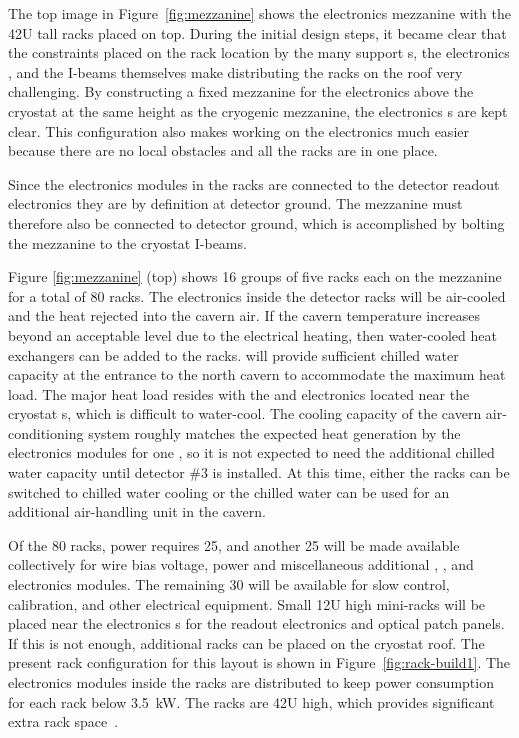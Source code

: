 The top image in Figure~\ref{fig:mezzanine} shows the  electronics mezzanine with the 42U tall racks placed on top. 
During the initial design steps, it became clear that the constraints placed on the rack location by the many  support \fdth{}s, the electronics \fdth, and the I-beams themselves make distributing the racks on the roof very challenging. 
By constructing a fixed mezzanine for the electronics above the cryostat at the same height as the cryogenic mezzanine, the electronics \fdth{}s are kept clear. 
This configuration also makes working on the electronics much easier because there are no local obstacles and all the racks are in one place.

Since %
the electronics modules in the  racks are connected to the detector readout electronics they are by definition at detector ground. The mezzanine must therefore also be connected to detector ground, which is accomplished by bolting the mezzanine to the cryostat I-beams. 
 
Figure \ref{fig:mezzanine} (top) shows 16 groups of five racks each
on the mezzanine for a total of 80 racks. 
The electronics inside the detector racks will be air-cooled and the heat rejected into the cavern air. 
If the cavern temperature increases beyond an acceptable level due to the electrical heating, then water-cooled heat exchangers can be added to the racks.  will provide sufficient chilled water capacity at the entrance to the north cavern to accommodate the maximum heat load. 
The major heat load resides with the  and  electronics located near the cryostat \fdth{}s, which is difficult to water-cool. 
The cooling capacity of the cavern air-conditioning system roughly matches the expected heat generation by the electronics modules for one , so it is not expected to need the additional chilled water capacity until detector \#3 is installed. 
At this time, either the racks can be switched to chilled water cooling or the chilled water can be used for an additional air-handling unit in the cavern.


Of the 80 racks,   power requires \num{25}, and another 25 will be made available collectively for   wire bias voltage,  power and miscellaneous additional , , and   electronics modules. 
The remaining 30 will be available for slow control, calibration, and other electrical equipment. 
Small 12U high mini-racks will  be placed near the electronics \fdth{}s for the  readout electronics and optical patch panels. If this is not enough, additional racks can be placed on the cryostat roof. The present rack configuration for this layout is shown in Figure~\ref{fig:rack-build1}. 
The electronics modules inside the racks are distributed to keep power consumption for each rack below \SI{3.5}{kW}. 
The racks are 42U high, which provides significant extra rack space~\cite{bib:docdb4499}.  


